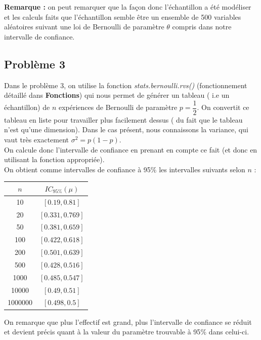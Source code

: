 \documentclass{article}      %
\begin{document}
\textbf{Remarque :} on peut remarquer que la façon donc l'échantillon a été modéliser et les calculs faits que l'échantillon semble être un ensemble de 500 variables aléatoires suivant une loi de Bernoulli de paramètre $\theta$ compris dans notre intervalle de confiance.

\subsection{Problème 3}
Dans le problème 3, on utilise la fonction \textit{stats.bernoulli.rvs()} (fonctionnement détaillé dans \textbf{Fonctions}) qui nous permet de générer un tableau ( i.e un échantillon) de $n$ expériences de Bernoulli de paramètre $p = \dfrac{1}{2}$. On convertit ce tableau en liste pour travailler plus facilement dessus ( du fait que le tableau n'est qu'une dimension). Dans le cas présent, nous connaissons la variance, qui vaut très exactement $\sigma^{2} = p(1-p)$.\\
On calcule donc l'intervalle de confiance en prenant en compte ce fait (et donc en utilisant la fonction appropriée).\\
On obtient comme intervalles de confiance à 95$\%$ les intervalles suivants selon $n$ : \\

\begin{center}
	\begin{tabular}{|c|c|}
		\hline 
		$n$ & $IC_{95\%}(\mu)$ \\ 
		\hline 
		10 & $[0.19, 0.81]$ \\ 
		\hline 
		20 & $[0.331, 0.769]$ \\ 
		\hline 
		50 & $[0.381, 0.659]$ \\ 
		\hline 
		100 & $[0.422, 0.618]$ \\ 
		\hline 
		200 & $[0.501, 0.639]$ \\ 
		\hline 
		500 & $[0.428, 0.516]$ \\ 
		\hline 
		1000 & $[0.485, 0.547]$ \\ 
		\hline 
		10000 & $[0.49, 0.51]$ \\ 
		\hline 
		1000000 & $[0.498, 0.5]$ \\ 
		\hline 
	\end{tabular}
\end{center}

On remarque que plus l'effectif est grand, plus l'intervalle de confiance se réduit et devient précis quant à la valeur du paramètre trouvable à 95$\%$ dans celui-ci. 
\end{document}
